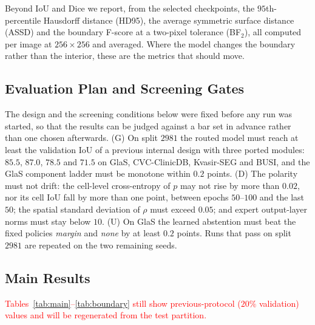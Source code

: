 Beyond IoU and Dice we report, from the selected checkpoints, the $95$th-percentile Hausdorff distance (HD95), the average symmetric surface distance (ASSD) and the boundary F-score at a two-pixel tolerance (BF$_2$), all computed per image at $256\times256$ and averaged. Where the model changes the boundary rather than the interior, these are the metrics that should move.

\subsection{Evaluation Plan and Screening Gates}
\label{sec:gates}

The design and the screening conditions below were fixed before any run was started, so that the results can be judged against a bar set in advance rather than one chosen afterwards. (G) On split $2981$ the routed model must reach at least the validation IoU of a previous internal design with three ported modules: $85.5$, $87.0$, $78.5$ and $71.5$ on GlaS, CVC-ClinicDB, Kvasir-SEG and BUSI, and the GlaS component ladder must be monotone within $0.2$ points. (D) The polarity must not drift: the cell-level cross-entropy of $p$ may not rise by more than $0.02$, nor its cell IoU fall by more than one point, between epochs $50$--$100$ and the last $50$; the spatial standard deviation of $\rho$ must exceed $0.05$; and expert output-layer norms must stay below $10$. (U) On GlaS the learned abstention must beat the fixed policies \emph{margin} and \emph{none} by at least $0.2$ points. Runs that pass on split $2981$ are repeated on the two remaining seeds.

\subsection{Main Results}
\label{sec:main-results}

\textcolor{red}{Tables~\ref{tab:main}--\ref{tab:boundary} still show previous-protocol ($20\%$ validation) values and will be regenerated from the test partition.}


